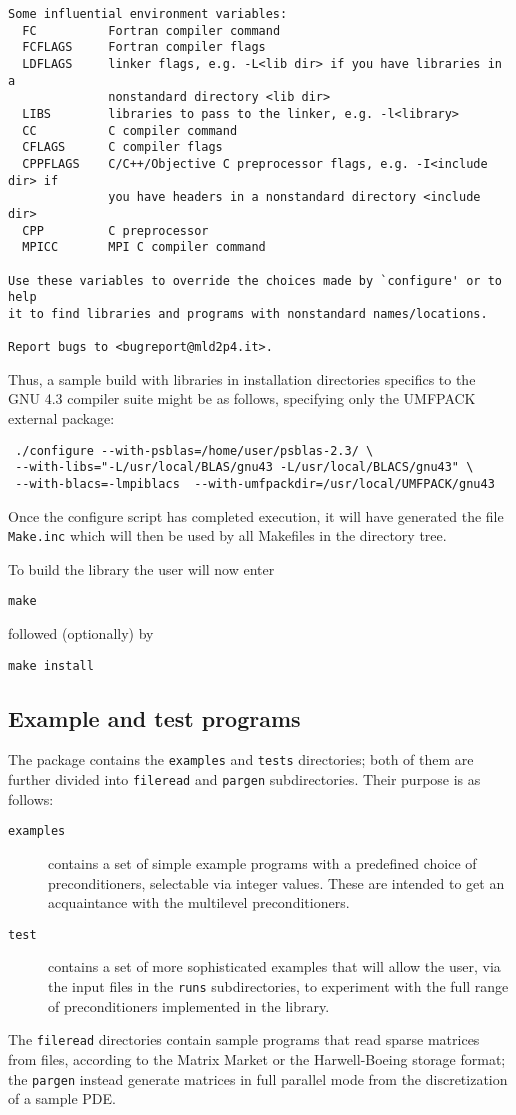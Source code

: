 \begin{verbatim}
Some influential environment variables:
  FC          Fortran compiler command
  FCFLAGS     Fortran compiler flags
  LDFLAGS     linker flags, e.g. -L<lib dir> if you have libraries in a
              nonstandard directory <lib dir>
  LIBS        libraries to pass to the linker, e.g. -l<library>
  CC          C compiler command
  CFLAGS      C compiler flags
  CPPFLAGS    C/C++/Objective C preprocessor flags, e.g. -I<include dir> if
              you have headers in a nonstandard directory <include dir>
  CPP         C preprocessor
  MPICC       MPI C compiler command

Use these variables to override the choices made by `configure' or to help
it to find libraries and programs with nonstandard names/locations.

Report bugs to <bugreport@mld2p4.it>.
\end{verbatim}
Thus, a sample build with libraries in installation
directories specifics to the GNU 4.3 compiler suite might be as
follows, specifying only the UMFPACK external package: 
\begin{verbatim}
 ./configure --with-psblas=/home/user/psblas-2.3/ \
 --with-libs="-L/usr/local/BLAS/gnu43 -L/usr/local/BLACS/gnu43" \
 --with-blacs=-lmpiblacs  --with-umfpackdir=/usr/local/UMFPACK/gnu43 
\end{verbatim}
Once the configure script has completed execution, it will have
generated the file \verb|Make.inc| which will then be used by all
Makefiles in the directory tree. 

To build the library the user will now enter 
\begin{verbatim}
make
\end{verbatim}
followed (optionally) by 
\begin{verbatim}
make install
\end{verbatim}

\subsection{Example and test programs\label{sec:ex_and_test}}
The package contains the \verb|examples| and \verb|tests| directories;
both of them are further divided into \verb|fileread| and
\verb|pargen| subdirectories. Their purpose is as follows:
\begin{description}
\item[\tt examples] contains a set of simple example programs with a
  predefined choice of preconditioners, selectable via integer
  values. These are intended to get an acquaintance with the
  multilevel preconditioners.
\item[\tt test] contains a set of more sophisticated examples that
  will allow the user, via the input files in the \verb|runs|
  subdirectories, to experiment with the full range of preconditioners
  implemented in the library.
\end{description}
The \verb|fileread| directories contain sample programs that read
sparse matrices from files, according to the Matrix Market or the
Harwell-Boeing storage format; the \verb|pargen| instead generate
matrices in full parallel mode from the discretization of a sample PDE. 
